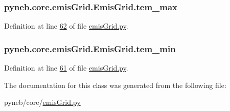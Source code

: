 \subsubsection[{tem\+\_\+max}]{\setlength{\rightskip}{0pt plus 5cm}pyneb.\+core.\+emis\+Grid.\+Emis\+Grid.\+tem\+\_\+max}\label{classpyneb_1_1core_1_1emis_grid_1_1_emis_grid_a2d0eacad9eb4fa87ef08d1f710cf2317}


Definition at line \hyperlink{emis_grid_8py_source_l00062}{62} of file \hyperlink{emis_grid_8py_source}{emis\+Grid.\+py}.

\hypertarget{classpyneb_1_1core_1_1emis_grid_1_1_emis_grid_abd8712ac536b051f866429da43f526de}{}
\subsubsection[{tem\+\_\+min}]{\setlength{\rightskip}{0pt plus 5cm}pyneb.\+core.\+emis\+Grid.\+Emis\+Grid.\+tem\+\_\+min}\label{classpyneb_1_1core_1_1emis_grid_1_1_emis_grid_abd8712ac536b051f866429da43f526de}


Definition at line \hyperlink{emis_grid_8py_source_l00061}{61} of file \hyperlink{emis_grid_8py_source}{emis\+Grid.\+py}.



The documentation for this class was generated from the following file\+:\begin{DoxyCompactItemize}
\item 
pyneb/core/\hyperlink{emis_grid_8py}{emis\+Grid.\+py}\end{DoxyCompactItemize}
